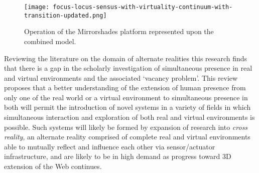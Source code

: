 




\begin{figure}[h]
	\begin{center}
		\texttt{[image: focus-locus-sensus-with-virtuality-continuum-with-transition-updated.png]}
		\caption{Operation of the Mirrorshades platform represented upon the combined model.}
		\label{focus-locus-sensus-with-virtuality-continuum-with-transition}
	\end{center}	
\end{figure}



Reviewing the literature on the domain of alternate realities this research finds that there is a gap in the scholarly investigation of simultaneous presence in real and virtual environments and the associated `vacancy problem'. This review proposes that a better understanding of the extension of human presence from only one of the real world or a virtual environment to simultaneous presence in both will permit the introduction of novel systems in a variety of fields in which simultaneous interaction and exploration of both real and virtual environments is possible. Such systems will likely be formed by expansion of research into \textit{cross reality}, an alternate reality comprised of complete real and virtual environments able to mutually reflect and influence each other via sensor/actuator infrastructure, and are likely to be in high demand as progress toward 3D extension of the Web continues.

